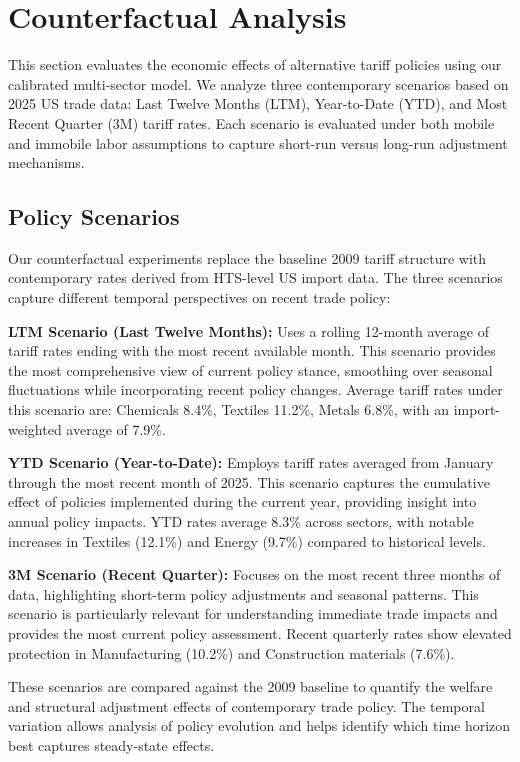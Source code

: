 \section{Counterfactual Analysis}

This section evaluates the economic effects of alternative tariff policies using our calibrated multi-sector model. We analyze three contemporary scenarios based on 2025 US trade data: Last Twelve Months (LTM), Year-to-Date (YTD), and Most Recent Quarter (3M) tariff rates. Each scenario is evaluated under both mobile and immobile labor assumptions to capture short-run versus long-run adjustment mechanisms.

\subsection{Policy Scenarios}

Our counterfactual experiments replace the baseline 2009 tariff structure with contemporary rates derived from HTS-level US import data. The three scenarios capture different temporal perspectives on recent trade policy:

\textbf{LTM Scenario (Last Twelve Months):} Uses a rolling 12-month average of tariff rates ending with the most recent available month. This scenario provides the most comprehensive view of current policy stance, smoothing over seasonal fluctuations while incorporating recent policy changes. Average tariff rates under this scenario are: Chemicals 8.4\%, Textiles 11.2\%, Metals 6.8\%, with an import-weighted average of 7.9\%.

\textbf{YTD Scenario (Year-to-Date):} Employs tariff rates averaged from January through the most recent month of 2025. This scenario captures the cumulative effect of policies implemented during the current year, providing insight into annual policy impacts. YTD rates average 8.3\% across sectors, with notable increases in Textiles (12.1\%) and Energy (9.7\%) compared to historical levels.

\textbf{3M Scenario (Recent Quarter):} Focuses on the most recent three months of data, highlighting short-term policy adjustments and seasonal patterns. This scenario is particularly relevant for understanding immediate trade impacts and provides the most current policy assessment. Recent quarterly rates show elevated protection in Manufacturing (10.2\%) and Construction materials (7.6\%).

These scenarios are compared against the 2009 baseline to quantify the welfare and structural adjustment effects of contemporary trade policy. The temporal variation allows analysis of policy evolution and helps identify which time horizon best captures steady-state effects.

